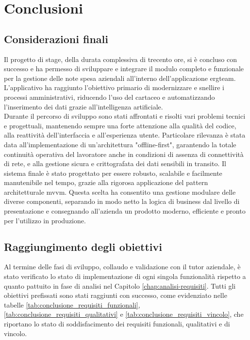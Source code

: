 \chapter{Conclusioni}
\label{chap:conclusioni}

\section{Considerazioni finali}
\noindent Il progetto di stage, della durata complessiva di trecento ore, si è concluso con successo e ha permesso di sviluppare e integrare il modulo completo e funzionale per la gestione delle note spesa aziendali all'interno dell'applicazione \gls{ergteam}. L'applicativo ha raggiunto l'obiettivo primario di modernizzare e snellire i processi amministrativi, riducendo l'uso del cartaceo e automatizzando l'inserimento dei dati grazie all'intelligenza artificiale. \\
Durante il percorso di sviluppo sono stati affrontati e risolti vari problemi tecnici e progettuali, mantenendo sempre una forte attenzione alla qualità del codice, alla reattività dell'interfaccia e all'esperienza utente. Particolare rilevanza è stata data all'implementazione di un'architettura "offline-first", garantendo la totale continuità operativa del lavoratore anche in condizioni di assenza di connettività di rete, e alla gestione sicura e crittografata dei dati sensibili in transito.
Il sistema finale è stato progettato per essere robusto, scalabile e facilmente manutenibile nel tempo, grazie alla rigorosa applicazione del pattern architetturale \gls{mvvm}. Questa scelta ha consentito una gestione modulare delle diverse componenti, separando in modo netto la logica di business dal livello di presentazione e consegnando all'azienda un prodotto moderno, efficiente e pronto per l'utilizzo in produzione.



\section{Raggiungimento degli obiettivi}
\noindent Al termine delle fasi di sviluppo, collaudo e validazione con il tutor aziendale, è stato verificato lo stato di implementazione di ogni singola funzionalità rispetto a quanto pattuito in fase di analisi nel Capitolo \ref{chap:analisi-requisiti}. Tutti gli obiettivi prefissati sono stati raggiunti con successo, come evidenziato nelle tabelle \ref{tab:conclusione_requisiti_funzionali}, \ref{tab:conclusione_requisiti_qualitativi} e \ref{tab:conclusione_requisiti_vincolo}, che riportano lo stato di soddisfacimento dei requisiti funzionali, qualitativi e di vincolo.

